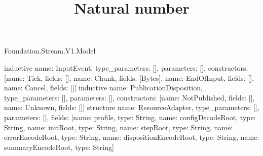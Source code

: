 \begin{lexlean}{Foundation.Stream.V1.Model}
\title{Natural number}
\begin{semanticmodule}
inductive{
  name: InputEvent, type_parameters: [], parameters: [],
  constructors: [{name: Tick, fields: []}, {name: Chunk, fields: [Bytes]}, {name: EndOfInput, fields: []}, {name: Cancel, fields: []}]
}
inductive{
  name: PublicationDisposition, type_parameters: [], parameters: [],
  constructors: [{name: NotPublished, fields: []}, {name: Unknown, fields: []}]
}
structure{
  name: ResourceAdapter, type_parameters: [], parameters: [],
  fields: [{name: profile, type: String}, {name: configDecodeRoot, type: String}, {name: initRoot, type: String}, {name: stepRoot, type: String}, {name: errorEncodeRoot, type: String}, {name: dispositionEncodeRoot, type: String}, {name: summaryEncodeRoot, type: String}]
}
\end{semanticmodule}
\end{lexlean}
